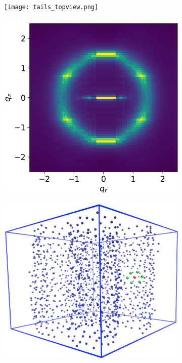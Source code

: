 \documentclass{article}
\begin{document}
  \begin{figure}[!ht]
	\centering
	\begin{subfigure}{0.45\textwidth}
		\centering
		\hspace{-1cm}
		\vspace{1cm}
		\texttt{[image: tails\_topview.png]}
		\caption{}\label{fig:tails_topview}
	\end{subfigure}
	\begin{subfigure}{0.45\textwidth}
		\centering
		\includegraphics[width=\textwidth]{tails_rzplot.png}
		\caption{}\label{fig:tails_rzplot}
	\end{subfigure}
	\begin{subfigure}{0.45\textwidth}
		\centering
		\includegraphics[width=\textwidth]{centroids_box.png}

\end{subfigure}
\end{figure}
\end{document}
